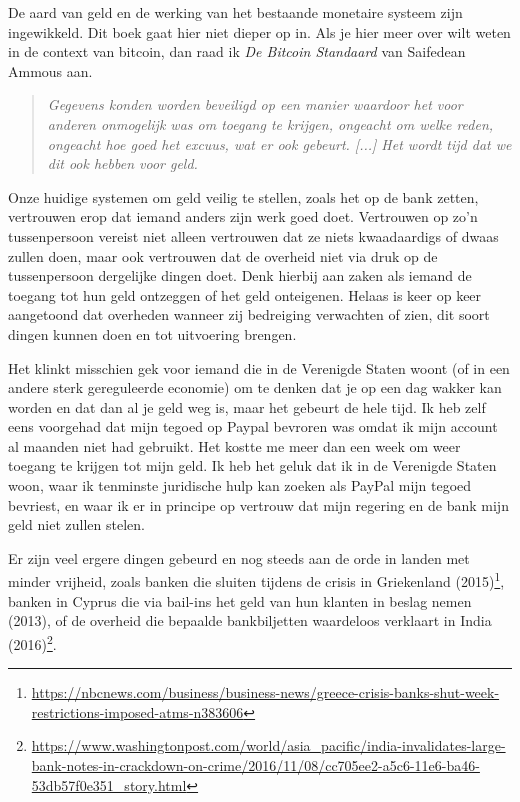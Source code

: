 De aard van geld en de werking van het bestaande monetaire systeem zijn ingewikkeld. Dit boek gaat hier niet dieper op in. Als je hier meer over wilt weten in de context van bitcoin, dan raad ik \textit{De Bitcoin Standaard} van Saifedean Ammous aan.

\begin{quote}
\textit{Gegevens konden worden beveiligd op een manier waardoor het voor anderen onmogelijk was om toegang te krijgen, ongeacht om welke reden, ongeacht hoe goed het excuus, wat er ook gebeurt. [...]
Het wordt tijd dat we dit ook hebben voor geld.} 
\end{quote}

Onze huidige systemen om geld veilig te stellen, zoals het op de bank zetten, vertrouwen erop dat iemand anders zijn werk goed doet. Vertrouwen op zo'n tussenpersoon vereist niet alleen vertrouwen dat ze niets kwaadaardigs of dwaas zullen doen, maar ook vertrouwen dat de overheid niet via druk op de tussenpersoon dergelijke dingen doet. Denk hierbij aan zaken als iemand de toegang tot hun geld ontzeggen of het geld onteigenen. Helaas is keer op keer aangetoond dat overheden wanneer zij bedreiging verwachten of zien, dit soort dingen kunnen doen en tot uitvoering brengen.

Het klinkt misschien gek voor iemand die in de Verenigde Staten woont (of in een andere sterk gereguleerde economie) om te denken dat je op een dag wakker kan worden en dat dan al je geld weg is, maar het gebeurt de hele tijd. Ik heb zelf eens voorgehad dat mijn tegoed op Paypal bevroren was omdat ik mijn account al maanden niet had gebruikt. Het kostte me meer dan een week om weer toegang te krijgen tot \textquotedbl{}mijn\textquotedbl{} geld. Ik heb het geluk dat ik in de Verenigde Staten woon, waar ik tenminste juridische hulp kan zoeken als PayPal mijn tegoed bevriest, en waar ik er in principe op vertrouw dat mijn regering en de bank mijn geld niet zullen stelen.

Er zijn veel ergere dingen gebeurd en nog steeds aan de orde in landen met minder vrijheid, zoals banken die sluiten tijdens de crisis in Griekenland (2015)\footnote{\href{https://www.nbcnews.com/business/business-news/greece-crisis-banks-shut-week-restrictions-imposed-atms-n383606}{https://nbcnews.com/business/business-news/greece-crisis-banks-shut-week-restrictions-imposed-atms-n383606}}, banken in Cyprus die via bail-ins het geld van hun klanten in beslag nemen (2013), of de overheid die bepaalde bankbiljetten waardeloos verklaart in India (2016)\footnote{\href{https://www.washingtonpost.com/world/asia\_pacific/india-invalidates-large-bank-notes-in-crackdown-on-crime/2016/11/08/cc705ee2-a5c6-11e6-ba46-53db57f0e351\_story.html}{https://www.washingtonpost.com/world/asia\_pacific/india-invalidates-large-bank-notes-in-crackdown-on-crime/2016/11/08/cc705ee2-a5c6-11e6-ba46-53db57f0e351\_story.html}}.

